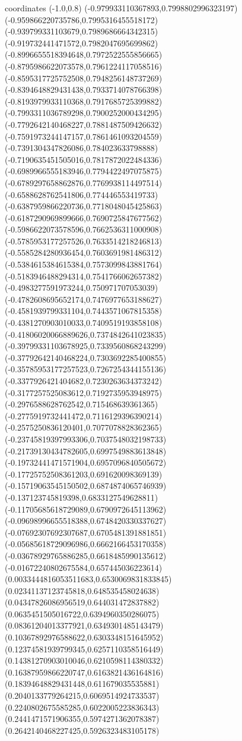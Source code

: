 coordinates {%
(-1.0,0.8)
(-0.979933110367893,0.7998802996323197)
(-0.959866220735786,0.7995316455518172)
(-0.939799331103679,0.7989686664342315)
(-0.919732441471572,0.7982047695699862)
(-0.8996655518394648,0.7972522555856665)
(-0.8795986622073578,0.7961224117058516)
(-0.8595317725752508,0.7948256148737269)
(-0.8394648829431438,0.7933714078766398)
(-0.8193979933110368,0.7917685725399882)
(-0.7993311036789298,0.7900252000434295)
(-0.7792642140468227,0.7881487509426632)
(-0.7591973244147157,0.7861461093204559)
(-0.7391304347826086,0.784023633798888)
(-0.7190635451505016,0.7817872022484336)
(-0.6989966555183946,0.7794422497075875)
(-0.6789297658862876,0.7769938114497514)
(-0.6588628762541806,0.774446553419733)
(-0.6387959866220736,0.7718048045425863)
(-0.6187290969899666,0.7690725847677562)
(-0.5986622073578596,0.7662536311000908)
(-0.5785953177257526,0.7633514218246813)
(-0.5585284280936454,0.7603691981486312)
(-0.5384615384615384,0.7573099843881764)
(-0.5183946488294314,0.7541766062657382)
(-0.4983277591973244,0.750971707053039)
(-0.4782608695652174,0.7476977653188627)
(-0.4581939799331104,0.7443571067815358)
(-0.4381270903010033,0.7409519193858108)
(-0.41806020066889626,0.7374842641023835)
(-0.39799331103678925,0.7339560868243299)
(-0.37792642140468224,0.7303692285400855)
(-0.35785953177257523,0.7267254344155136)
(-0.3377926421404682,0.7230263634373242)
(-0.3177257525083612,0.7192735953948975)
(-0.2976588628762542,0.715468639361365)
(-0.2775919732441472,0.7116129396390214)
(-0.2575250836120401,0.7077078828362365)
(-0.23745819397993306,0.7037548032198733)
(-0.21739130434782605,0.6997549883613848)
(-0.19732441471571904,0.6957096840505672)
(-0.17725752508361203,0.691620098369139)
(-0.15719063545150502,0.6874874065746939)
(-0.137123745819398,0.6833127549628811)
(-0.11705685618729089,0.6790972645113962)
(-0.09698996655518388,0.6748420330337627)
(-0.07692307692307687,0.6705481391881851)
(-0.05685618729096986,0.6662166453170358)
(-0.03678929765886285,0.6618485990135612)
(-0.01672240802675584,0.657445036223614)
(0.0033444816053511683,0.6530069831833845)
(0.02341137123745818,0.648535458024638)
(0.04347826086956519,0.644031472837882)
(0.0635451505016722,0.6394960350286075)
(0.08361204013377921,0.6349301485143479)
(0.10367892976588622,0.6303348151645952)
(0.12374581939799345,0.6257110358516449)
(0.14381270903010046,0.6210598114380332)
(0.16387959866220747,0.6163821436164816)
(0.18394648829431448,0.611679035535881)
(0.2040133779264215,0.6069514924733537)
(0.2240802675585285,0.6022005223836343)
(0.2441471571906355,0.5974271362078387)
(0.2642140468227425,0.5926323483105178)
}
